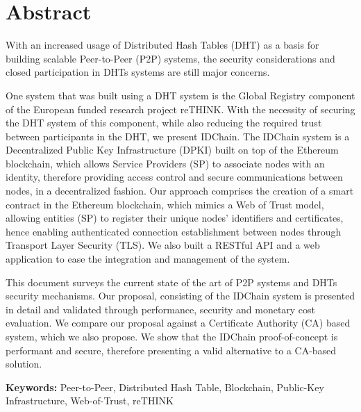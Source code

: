 \chapter*{Abstract}


With an increased usage of Distributed Hash Tables (DHT) as a basis for building scalable Peer-to-Peer (P2P) systems, the security considerations and closed participation in DHTs systems are still major concerns.

One system that was built using a DHT system is the Global Registry component of the European funded research project reTHINK.
With the necessity of securing the DHT system of this component, while also reducing the required trust between participants in the DHT, we present IDChain.
The IDChain system is a Decentralized Public Key Infrastructure (DPKI) built on top of the Ethereum blockchain, which allows Service Providers (SP) to associate nodes with an identity, therefore providing access control and secure communications between nodes, in a decentralized fashion.
Our approach comprises the creation of a smart contract in the Ethereum blockchain, which mimics a Web of Trust model, allowing entities (SP) to register their unique nodes' identifiers and certificates, hence enabling authenticated connection establishment between nodes through Transport Layer Security (TLS).
We also built a RESTful API and a web application to ease the integration and management of the system.

This document surveys the current state of the art of P2P systems and DHTs security mechanisms.
Our proposal, consisting of the IDChain system is presented in detail and validated through performance, security and monetary cost evaluation.
We compare our proposal against a Certificate Authority (CA) based system, which we also propose.
We show that the IDChain proof-of-concept is performant and secure, therefore presenting a valid alternative to a CA-based solution.

\vspace{1cm}

\textbf{\Large Keywords:} Peer-to-Peer, Distributed Hash Table, Blockchain, Public-Key Infrastructure, Web-of-Trust, reTHINK

\cleardoublepage
